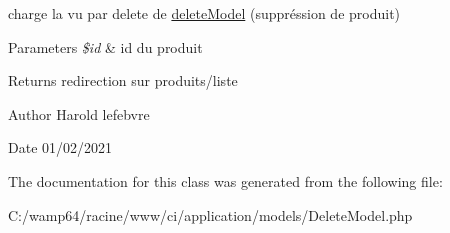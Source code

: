 charge la vu par delete de \mbox{\hyperlink{classdelete_model}{delete\+Model}} (suppréssion de produit) 


\begin{DoxyParams}{Parameters}
{\em \$id} & id du produit \\
\hline
\end{DoxyParams}
\begin{DoxyReturn}{Returns}
redirection sur produits/liste 
\end{DoxyReturn}
\begin{DoxyAuthor}{Author}
Harold lefebvre 
\end{DoxyAuthor}
\begin{DoxyDate}{Date}
01/02/2021 
\end{DoxyDate}


The documentation for this class was generated from the following file\+:\begin{DoxyCompactItemize}
\item 
C\+:/wamp64/racine/www/ci/application/models/Delete\+Model.\+php\end{DoxyCompactItemize}
